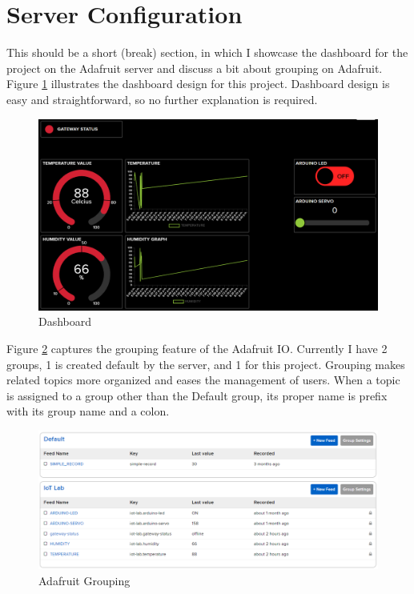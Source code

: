\section{Server Configuration}
\label{section:server}
This should be a short (break) section, in which I showcase the dashboard for the project on the Adafruit server and discuss a bit about grouping on Adafruit. Figure \ref{fig:dashboard} illustrates the dashboard design for this project. Dashboard design is easy and straightforward, so no further explanation is required.
\begin{figure}
    \centering
    \includegraphics[scale=0.45]{screenshots/dashboard.png}
    \caption{Dashboard}
    \label{fig:dashboard}
\end{figure}

Figure \ref{fig:groups} captures the grouping feature of the Adafruit IO. Currently I have 2 groups, 1 is created default by the server, and 1 for this project. Grouping makes related topics more organized and eases the management of users. When a topic is assigned to a group other than the Default group, its proper name is prefix with its group name and a colon. 
\begin{figure}
    \centering
    \includegraphics[scale=0.45]{screenshots/groups.png}
    \caption{Adafruit Grouping}
    \label{fig:groups}
\end{figure}
\clearpage